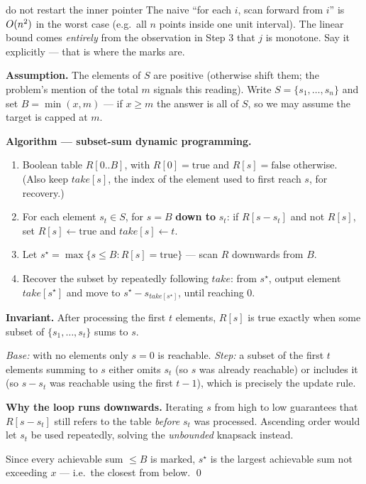 \begin{trap}{do not restart the inner pointer}
The naive ``for each $i$, scan forward from $i$'' is $O(n^2)$ in the worst case (e.g.\ all $n$
points inside one unit interval). The linear bound comes \emph{entirely} from the observation in
Step 3 that $j$ is monotone. Say it explicitly --- that is where the marks are.
\end{trap}

\textbf{Assumption.} The elements of $S$ are positive (otherwise shift them; the problem's mention
of the total $m$ signals this reading). Write $S=\{s_1,\dots,s_n\}$ and set $B=\min(x,m)$ --- if
$x\ge m$ the answer is all of $S$, so we may assume the target is capped at $m$.

\textbf{Algorithm --- subset-sum dynamic programming.}
\begin{enumerate}
  \item Boolean table $R[0..B]$, with $R[0]=\text{true}$ and $R[s]=\text{false}$ otherwise. (Also
        keep $\mathit{take}[s]$, the index of the element used to first reach $s$, for recovery.)
  \item For each element $s_t\in S$, for $s=B$ \textbf{down to} $s_t$:
        if $R[s-s_t]$ and not $R[s]$, set $R[s]\leftarrow\text{true}$ and
        $\mathit{take}[s]\leftarrow t$.
  \item Let $s^\star=\max\{s\le B:R[s]=\text{true}\}$ --- scan $R$ downwards from $B$.
  \item Recover the subset by repeatedly following $\mathit{take}$: from $s^\star$, output element
        $\mathit{take}[s^\star]$ and move to $s^\star-s_{\mathit{take}[s^\star]}$, until reaching
        $0$.
\end{enumerate}

\begin{correct}
\textbf{Invariant.} After processing the first $t$ elements, $R[s]$ is true exactly when some
subset of $\{s_1,\dots,s_t\}$ sums to $s$.

\emph{Base:} with no elements only $s=0$ is reachable. \emph{Step:} a subset of the first $t$
elements summing to $s$ either omits $s_t$ (so $s$ was already reachable) or includes it (so
$s-s_t$ was reachable using the first $t-1$), which is precisely the update rule.

\textbf{Why the loop runs downwards.} Iterating $s$ from high to low guarantees that
$R[s-s_t]$ still refers to the table \emph{before} $s_t$ was processed. Ascending order would let
$s_t$ be used repeatedly, solving the \emph{unbounded} knapsack instead.

Since every achievable sum $\le B$ is marked, $s^\star$ is the largest achievable sum not
exceeding $x$ --- i.e.\ the closest from below. \qed
\end{correct}

